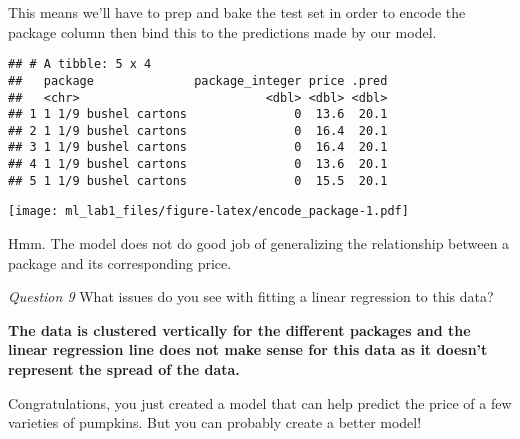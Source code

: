 \documentclass[
]{article}
\begin{document}
This means we'll have to prep and bake the test set in order to encode
the package column then bind this to the predictions made by our model.

\begin{verbatim}
## # A tibble: 5 x 4
##   package              package_integer price .pred
##   <chr>                          <dbl> <dbl> <dbl>
## 1 1 1/9 bushel cartons               0  13.6  20.1
## 2 1 1/9 bushel cartons               0  16.4  20.1
## 3 1 1/9 bushel cartons               0  16.4  20.1
## 4 1 1/9 bushel cartons               0  13.6  20.1
## 5 1 1/9 bushel cartons               0  15.5  20.1
\end{verbatim}

\texttt{[image: ml\_lab1\_files/figure-latex/encode\_package-1.pdf]}

Hmm. The model does not do good job of generalizing the relationship
between a package and its corresponding price.

\emph{Question 9} What issues do you see with fitting a linear
regression to this data?

\textbf{The data is clustered vertically for the different packages and
the linear regression line does not make sense for this data as it
doesn't represent the spread of the data.}

Congratulations, you just created a model that can help predict the
price of a few varieties of pumpkins. But you can probably create a
better model!
\end{document}
